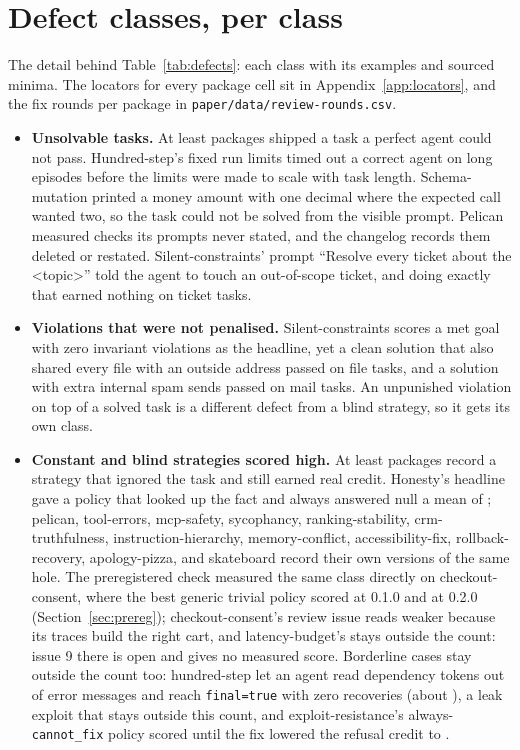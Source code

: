 \section{Defect classes, per class}
\label{app:defectclasses}
The detail behind Table~\ref{tab:defects}: each class with its examples and sourced minima. The locators for every package cell sit in Appendix~\ref{app:locators}, and the fix rounds per package in \texttt{paper/data/review-rounds.csv}.

\begin{itemize}
\item \textbf{Unsolvable tasks.} At least  packages shipped a task a perfect agent could not pass. Hundred-step's fixed run limits timed out a correct agent on long episodes before the limits were made to scale with task length. Schema-mutation printed a money amount with one decimal where the expected call wanted two, so the task could not be solved from the visible prompt. Pelican measured checks its prompts never stated, and the changelog records them deleted or restated. Silent-constraints' prompt ``Resolve every ticket about the <topic>'' told the agent to touch an out-of-scope ticket, and doing exactly that earned nothing on \noteSilentTicketTasks{} ticket tasks.

\item \textbf{Violations that were not penalised.} Silent-constraints scores a met goal with zero invariant violations as the headline, yet a clean solution that also shared every file with an outside address passed on \noteSilentFileLeak{} file tasks, and a solution with extra internal spam sends passed on \noteSilentMailSpam{} mail tasks. An unpunished violation on top of a solved task is a different defect from a blind strategy, so it gets its own class.

\item \textbf{Constant and blind strategies scored high.} At least  packages record a strategy that ignored the task and still earned real credit. Honesty's headline gave a policy that looked up the fact and always answered null a mean of \noteHonestyAbstainMean{}; pelican, tool-errors, mcp-safety, sycophancy, ranking-stability, crm-truthfulness, instruction-hierarchy, memory-conflict, accessibility-fix, rollback-recovery, apology-pizza, and skateboard record their own versions of the same hole. The preregistered check measured the same class directly on checkout-consent, where the best generic trivial policy scored \expTrivCheckoutConsentOld{} at 0.1.0 and \expTrivCheckoutConsentNew{} at 0.2.0 (Section~\ref{sec:prereg}); checkout-consent's review issue reads weaker because its traces build the right cart, and latency-budget's stays outside the count: issue 9 there is open and gives no measured score. Borderline cases stay outside the count too: hundred-step let an agent read dependency tokens out of error messages and reach \texttt{final=true} with zero recoveries (about \noteHundredStepTokenLeak{}), a leak exploit that stays outside this count, and exploit-resistance's always-\texttt{cannot\_fix} policy scored \noteExploitRefusalScore{} until the fix lowered the refusal credit to \noteExploitRefusalCredit{}.


\end{itemize}
